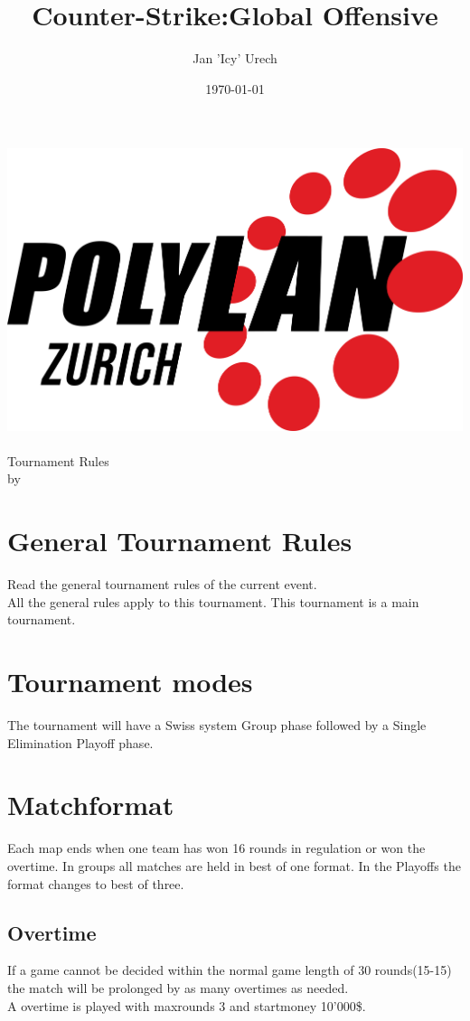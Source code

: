 \documentclass{article}
\title{Counter-Strike:Global Offensive}
\author{Jan 'Icy' Urech}
\date{\today}
\begin{document}
\makeatletter
\begin{titlepage}
\centering
\includegraphics[scale=0.1]{../img/PolyLAN_Zurich_black.png}\\
\LARGE \@title\\ Tournament Rules\\ \normalsize by \@author\\ \@date
\end{titlepage}
\makeatother


\clearpage

\tableofcontents
\clearpage

\section{General Tournament Rules}
Read the general tournament rules of the current event.\\
All the general rules apply to this tournament. This tournament is a main tournament.

\section{Tournament modes}
The tournament will have a Swiss system Group phase followed by a Single Elimination Playoff phase.

\section{Matchformat}
Each map ends when one team has won 16 rounds in regulation or won the overtime.
In groups all matches are held in best of one format. In the Playoffs the format changes to best of three.

\subsection{Overtime}
If a game cannot be decided within the normal game length of 30 rounds(15-15) the match will be prolonged by as many overtimes as needed.\\
A overtime is played with maxrounds 3 and startmoney 10'000\$.
\end{document}
